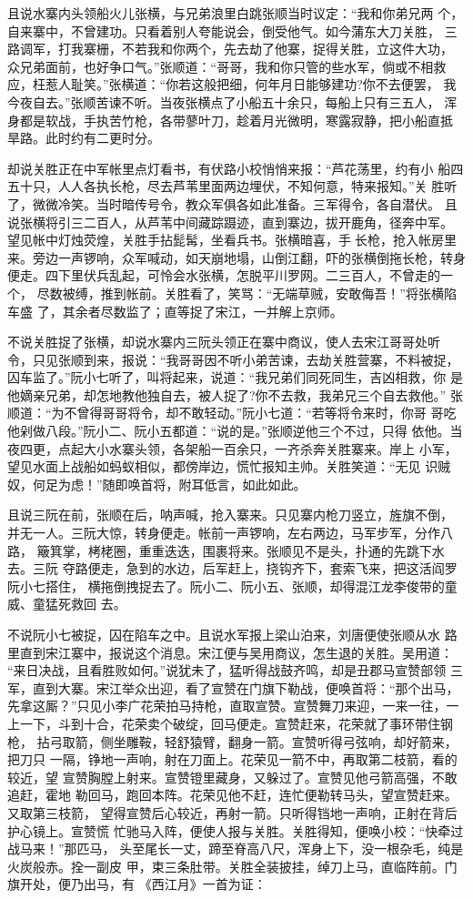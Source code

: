 且说水寨内头领船火儿张横，与兄弟浪里白跳张顺当时议定：“我和你弟兄两
个，自来寨中，不曾建功。只看着别人夸能说会，倒受他气。如今蒲东大刀关胜，
三路调军，打我寨栅，不若我和你两个，先去劫了他寨，捉得关胜，立这件大功，
众兄弟面前，也好争口气。”张顺道：“哥哥，我和你只管的些水军，倘或不相救
应，枉惹人耻笑。”张横道：“你若这般把细，何年月日能够建功?你不去便罢，
我今夜自去。”张顺苦谏不听。当夜张横点了小船五十余只，每船上只有三五人，
浑身都是软战，手执苦竹枪，各带蓼叶刀，趁着月光微明，寒露寂静，把小船直抵
旱路。此时约有二更时分。

却说关胜正在中军帐里点灯看书，有伏路小校悄悄来报：“芦花荡里，约有小
船四五十只，人人各执长枪，尽去芦苇里面两边埋伏，不知何意，特来报知。”关
胜听了，微微冷笑。当时暗传号令，教众军俱各如此准备。三军得令，各自潜伏。
且说张横将引三二百人，从芦苇中间藏踪蹑迹，直到寨边，拔开鹿角，径奔中军。
望见帐中灯烛荧煌，关胜手拈髭髯，坐看兵书。张横暗喜，手长枪，抢入帐房里
来。旁边一声锣响，众军喊动，如天崩地塌，山倒江翻，吓的张横倒拖长枪，转身
便走。四下里伏兵乱起，可怜会水张横，怎脱平川罗网。二三百人，不曾走的一个，
尽数被缚，推到帐前。关胜看了，笑骂：“无端草贼，安敢侮吾！”将张横陷车盛
了，其余者尽数监了；直等捉了宋江，一并解上京师。

不说关胜捉了张横，却说水寨内三阮头领正在寨中商议，使人去宋江哥哥处听
令，只见张顺到来，报说：“我哥哥因不听小弟苦谏，去劫关胜营寨，不料被捉，
囚车监了。”阮小七听了，叫将起来，说道：“我兄弟们同死同生，吉凶相救，你
是他嫡亲兄弟，却怎地教他独自去，被人捉了?你不去救，我弟兄三个自去救他。”
张顺道：“为不曾得哥哥将令，却不敢轻动。”阮小七道：“若等将令来时，你哥
哥吃他剁做八段。”阮小二、阮小五都道：“说的是。”张顺逆他三个不过，只得
依他。当夜四更，点起大小水寨头领，各架船一百余只，一齐杀奔关胜寨来。岸上
小军，望见水面上战船如蚂蚁相似，都傍岸边，慌忙报知主帅。关胜笑道：“无见
识贼奴，何足为虑！”随即唤首将，附耳低言，如此如此。

且说三阮在前，张顺在后，呐声喊，抢入寨来。只见寨内枪刀竖立，旌旗不倒，
并无一人。三阮大惊，转身便走。帐前一声锣响，左右两边，马军步军，分作八路，
簸箕掌，栲栳圈，重重迭迭，围裹将来。张顺见不是头，扑通的先跳下水去。三阮
夺路便走，急到的水边，后军赶上，挠钩齐下，套索飞来，把这活阎罗阮小七搭住，
横拖倒拽捉去了。阮小二、阮小五、张顺，却得混江龙李俊带的童威、童猛死救回
去。

不说阮小七被捉，囚在陷车之中。且说水军报上梁山泊来，刘唐便使张顺从水
路里直到宋江寨中，报说这个消息。宋江便与吴用商议，怎生退的关胜。吴用道：
“来日决战，且看胜败如何。”说犹未了，猛听得战鼓齐鸣，却是丑郡马宣赞部领
三军，直到大寨。宋江举众出迎，看了宣赞在门旗下勒战，便唤首将：“那个出马，
先拿这厮？”只见小李广花荣拍马持枪，直取宣赞。宣赞舞刀来迎，一来一往，一
上一下，斗到十合，花荣卖个破绽，回马便走。宣赞赶来，花荣就了事环带住钢枪，
拈弓取箭，侧坐雕鞍，轻舒猿臂，翻身一箭。宣赞听得弓弦响，却好箭来，把刀只
一隔，铮地一声响，射在刀面上。花荣见一箭不中，再取第二枝箭，看的较近，望
宣赞胸膛上射来。宣赞镫里藏身，又躲过了。宣赞见他弓箭高强，不敢追赶，霍地
勒回马，跑回本阵。花荣见他不赶，连忙便勒转马头，望宣赞赶来。又取第三枝箭，
望得宣赞后心较近，再射一箭。只听得铛地一声响，正射在背后护心镜上。宣赞慌
忙驰马入阵，便使人报与关胜。关胜得知，便唤小校：“快牵过战马来！”那匹马，
头至尾长一丈，蹄至脊高八尺，浑身上下，没一根杂毛，纯是火炭般赤。拴一副皮
甲，束三条肚带。关胜全装披挂，绰刀上马，直临阵前。门旗开处，便乃出马，有
《西江月》一首为证：

